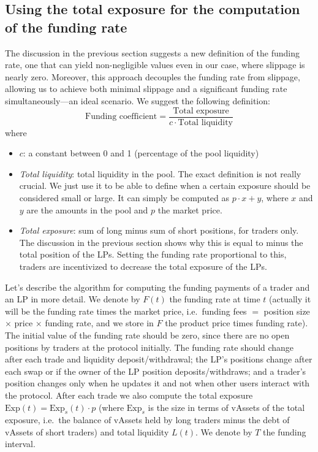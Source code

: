 \documentclass{article}
\begin{document}
\subsection{Using the total exposure for the computation of the funding rate}

The discussion in the previous section suggests a new definition of the funding rate, one
that can yield non-negligible values even in our case, where slippage is nearly zero.
Moreover, this approach decouples the funding rate from slippage, allowing us to achieve
both minimal slippage and a significant funding rate simultaneously---an ideal scenario.
We suggest the following definition:
\begin{equation}\label{funding coefficient}
\text{Funding coefficient} = \frac{\text{Total exposure}}{c \cdot \text{Total liquidity}}
\end{equation}
where
\begin{itemize}
\item $c$: a constant between 0 and 1 (percentage of the pool liquidity)

\item \textit{Total liquidity}: total liquidity in the pool. The exact definition is not
      really crucial. We just use it to be able to define when a certain exposure should
      be considered small or large. It can simply be computed as $p \cdot x + y$, where
      $x$ and $y$ are the amounts in the pool and $p$ the market price.

\item \textit{Total exposure}: sum of long minus sum of short positions, for traders only.
      The discussion in the previous section shows why this is equal to minus the total
      position of the LPs. Setting the funding rate proportional to this, traders are
      incentivized to decrease the total exposure of the LPs.
\end{itemize}

Let's describe the algorithm for computing the funding payments of a trader and an LP in
more detail. We denote by $F(t)$ the funding rate at time $t$ (actually it will be the
funding rate times the market price, i.e.\ funding fees $=$ position size $\times$ price
$\times$ funding rate, and we store in $F$ the product price times funding rate). The
initial value of the funding rate should be zero, since there are no open positions by
traders at the protocol initially. The funding rate should change after each trade and
liquidity deposit/withdrawal; the LP's positions change after each swap or if the owner of
the LP position deposits/withdraws; and a trader's position changes only when he updates it
and not when other users interact with the protocol. After each trade we also compute the
total exposure $\mathrm{Exp}(t) = \mathrm{Exp}_s(t) \cdot p$ (where $\mathrm{Exp}_s$ is
the size in terms of vAssets of the total exposure, i.e.\ the balance of vAssets held by
long traders minus the debt of vAssets of short traders) and total liquidity $L(t)$. We
denote by $T$ the funding interval.
\end{document}
